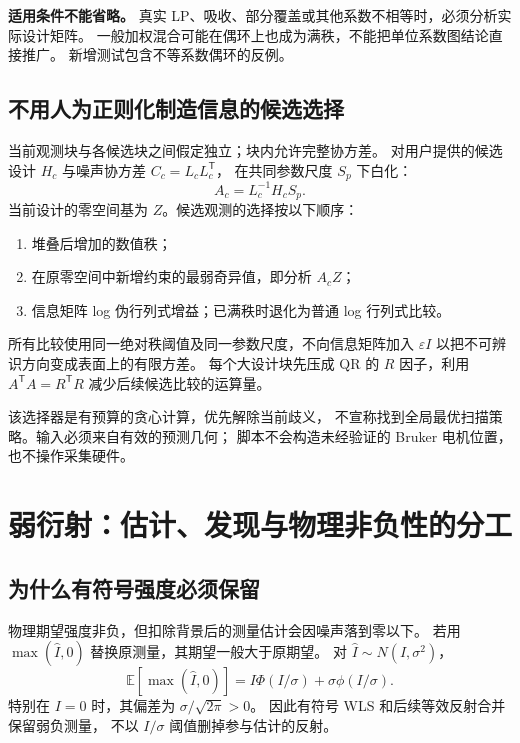 \documentclass[UTF8,11pt,a4paper,fontset=fandol]{ctexart}
\newcommand{\T}{^{\mathsf T}}
\begin{document}
\textbf{适用条件不能省略。}
真实 LP、吸收、部分覆盖或其他系数不相等时，必须分析实际设计矩阵。
一般加权混合可能在偶环上也成为满秩，不能把单位系数图结论直接推广。
新增测试包含不等系数偶环的反例。

\subsection{不用人为正则化制造信息的候选选择}

当前观测块与各候选块之间假定独立；块内允许完整协方差。
对用户提供的候选设计 $H_c$ 与噪声协方差 $C_c=L_cL_c\T$，
在共同参数尺度 $S_p$ 下白化：
\begin{equation}
A_c=L_c^{-1}H_cS_p.
\end{equation}
当前设计的零空间基为 $Z$。候选观测的选择按以下顺序：
\begin{enumerate}
\item 堆叠后增加的数值秩；
\item 在原零空间中新增约束的最弱奇异值，即分析 $A_cZ$；
\item 信息矩阵 log 伪行列式增益；已满秩时退化为普通 log 行列式比较。
\end{enumerate}
所有比较使用同一绝对秩阈值及同一参数尺度，不向信息矩阵加入 $\varepsilon I$
以把不可辨识方向变成表面上的有限方差。
每个大设计块先压成 QR 的 $R$ 因子，利用 $A\T A=R\T R$
减少后续候选比较的运算量。

该选择器是有预算的贪心计算，优先解除当前歧义，
不宣称找到全局最优扫描策略。输入必须来自有效的预测几何；
脚本不会构造未经验证的 Bruker 电机位置，也不操作采集硬件。

\section{弱衍射：估计、发现与物理非负性的分工}

\subsection{为什么有符号强度必须保留}

物理期望强度非负，但扣除背景后的测量估计会因噪声落到零以下。
若用 $\max(\widehat I,0)$ 替换原测量，其期望一般大于原期望。
对 $\widehat I\sim N(I,\sigma^2)$，
\begin{equation}
\mathbb E[\max(\widehat I,0)]
=I\Phi(I/\sigma)+\sigma\phi(I/\sigma).
\end{equation}
特别在 $I=0$ 时，其偏差为 $\sigma/\sqrt{2\pi}>0$。
因此有符号 WLS 和后续等效反射合并保留弱负测量，
不以 $I/\sigma$ 阈值删掉参与估计的反射。
\end{document}
